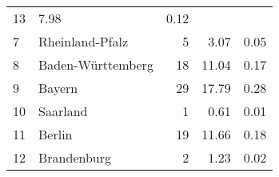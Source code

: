 \begin{longtable}{lXrrr}
       \num{13} &
       \num[round-mode=places,round-precision=2]{7,98} &
         \num[round-mode=places,round-precision=2]{0,12} \\

     7 &
     \multicolumn{1}{X}{ Rheinland-Pfalz   } &


       \num{5} &
       \num[round-mode=places,round-precision=2]{3,07} &
         \num[round-mode=places,round-precision=2]{0,05} \\

     8 &
     \multicolumn{1}{X}{ Baden-Württemberg   } &


       \num{18} &
       \num[round-mode=places,round-precision=2]{11,04} &
         \num[round-mode=places,round-precision=2]{0,17} \\

     9 &
     \multicolumn{1}{X}{ Bayern   } &


       \num{29} &
       \num[round-mode=places,round-precision=2]{17,79} &
         \num[round-mode=places,round-precision=2]{0,28} \\

     10 &
     \multicolumn{1}{X}{ Saarland   } &


       \num{1} &
       \num[round-mode=places,round-precision=2]{0,61} &
         \num[round-mode=places,round-precision=2]{0,01} \\

     11 &
     \multicolumn{1}{X}{ Berlin   } &


       \num{19} &
       \num[round-mode=places,round-precision=2]{11,66} &
         \num[round-mode=places,round-precision=2]{0,18} \\

     12 &
     \multicolumn{1}{X}{ Brandenburg   } &


       \num{2} &
       \num[round-mode=places,round-precision=2]{1,23} &
         \num[round-mode=places,round-precision=2]{0,02} \\


\end{longtable}
